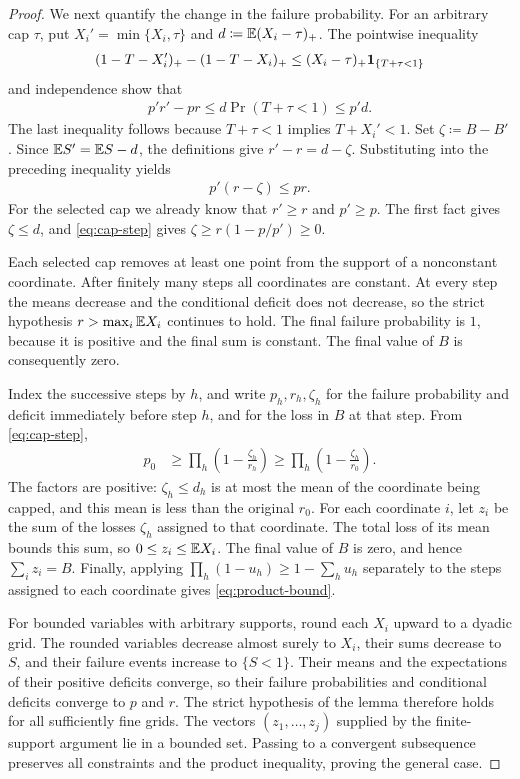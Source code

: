 \begin{proof}
We next quantify the change in the failure probability. For an arbitrary cap $\tau$, put $X_i'=\min\{X_i,\tau\}$ and $d\coloneqq\mathbb E(X_i-\tau)_+$. The pointwise inequality
\begin{align*}
 (1-T-X_i')_+-(1-T-X_i)_+
 \le (X_i-\tau)_+\mathbf 1_{\{T+\tau<1\}}
\end{align*}
and independence show that
\begin{align*}
 p'r'-pr\le d\Pr(T+\tau<1)\le p'd.
\end{align*}
The last inequality follows because $T+\tau<1$ implies $T+X_i'<1$. Set $\zeta\coloneqq B-B'$. Since $\mathbb E S'=\mathbb E S-d$, the definitions give $r'-r=d-\zeta$. Substituting into the preceding inequality yields
\begin{align}\label{eq:cap-step}
 p'(r-\zeta)\le pr.
\end{align}
For the selected cap we already know that $r'\ge r$ and $p'\ge p$. The first fact gives $\zeta\le d$, and \cref{eq:cap-step} gives $\zeta\ge r(1-p/p')\ge0$.

Each selected cap removes at least one point from the support of a nonconstant coordinate. After finitely many steps all coordinates are constant. At every step the means decrease and the conditional deficit does not decrease, so the strict hypothesis $r>\max_i\mathbb E X_i$ continues to hold. The final failure probability is $1$, because it is positive and the final sum is constant. The final value of $B$ is consequently zero.

Index the successive steps by $h$, and write $p_h,r_h,\zeta_h$ for the failure probability and deficit immediately before step $h$, and for the loss in $B$ at that step. From \cref{eq:cap-step},
\begin{align*}
 p_0
 &\ge\prod_h\left(1-\frac{\zeta_h}{r_h}\right)
 \ge\prod_h\left(1-\frac{\zeta_h}{r_0}\right).
\end{align*}
The factors are positive: $\zeta_h\le d_h$ is at most the mean of the coordinate being capped, and this mean is less than the original $r_0$. For each coordinate $i$, let $z_i$ be the sum of the losses $\zeta_h$ assigned to that coordinate. The total loss of its mean bounds this sum, so $0\le z_i\le\mathbb E X_i$. The final value of $B$ is zero, and hence $\sum_i z_i=B$. Finally, applying $\prod_h(1-u_h)\ge1-\sum_hu_h$ separately to the steps assigned to each coordinate gives \cref{eq:product-bound}.

For bounded variables with arbitrary supports, round each $X_i$ upward to a dyadic grid. The rounded variables decrease almost surely to $X_i$, their sums decrease to $S$, and their failure events increase to $\{S<1\}$. Their means and the expectations of their positive deficits converge, so their failure probabilities and conditional deficits converge to $p$ and $r$. The strict hypothesis of the lemma therefore holds for all sufficiently fine grids. The vectors $(z_1,\ldots,z_j)$ supplied by the finite-support argument lie in a bounded set. Passing to a convergent subsequence preserves all constraints and the product inequality, proving the general case.
\end{proof}

